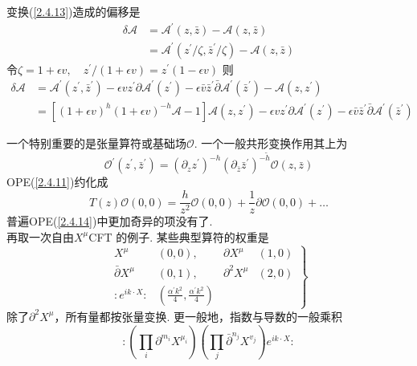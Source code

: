 \begin{remark}
变换(\ref{2.4.13})造成的偏移是
$$
\begin{aligned}
\delta \mathscr{A} &=\mathscr{A}^{\prime}(z, \bar{z})-\mathscr{A}(z, \bar{z}) \\
&=\mathscr{A}^{\prime}(z^{\prime} / \zeta, \bar{z}^{\prime} / \zeta)-\mathscr{A} ( z, \bar{z})
\end{aligned}
$$
令$\zeta=1+\epsilon v, \quad z^{\prime} / (1+\epsilon v)=z^{\prime}(1-\epsilon v)$
则
$$
\begin{aligned}
\delta \mathscr{A} &=\mathscr{A}^{\prime}(z^{\prime}, \bar{z}^{\prime})-\epsilon v z^{\prime} \partial \mathscr{A}^{\prime}\left(z^{\prime}\right)-\epsilon \bar{v}{\bar{z}^{\prime}} \bar{\partial} \mathscr{A}^{\prime}(\bar{z}^{\prime})-\mathscr{A}(z, z^{\prime}) \\
&=[(1+\epsilon v)^{h}(1+\epsilon v)^{-h} \mathscr{A}-1]   \mathscr{A}(z, z^{\prime}) 
-\epsilon v z^{\prime} \partial \mathscr{A}^{\prime}(z^{\prime})-\epsilon \bar{v} \bar{z}^{\prime} \bar{\partial} \mathscr{A}^{\prime}(\bar{z}^{\prime})
\end{aligned}
$$
\end{remark}
一个特别重要的是张量算符或基础场$\mathcal{O}$.  一个一般共形变换作用其上为
\begin{equation}
\mathcal{O}^{\prime}\left(z^{\prime}, \bar{z}^{\prime}\right)=\left(\partial_{z} z^{\prime}\right)^{-h}\left(\partial_{\bar{z}} \bar{z}^{\prime}\right)^{-\tilde{h}} \mathcal{O}(z, \bar{z})
\end{equation}
OPE(\ref{2.4.11})约化成
\begin{equation}\label{2.4.16}
T(z) \mathcal{O}(0,0)=\frac{h}{z^{2}} \mathcal{O}(0,0)+\frac{1}{z} \partial \mathcal{O}(0,0)+\ldots
\end{equation}
普遍OPE(\ref{2.4.14})中更加奇异的项没有了.\\
再取一次自由$X^\mu$CFT 的例子. 某些典型算符的权重是
\begin{equation}
\left.\begin{array}{llll}
X^{\mu} & (0,0), & \partial X^{\mu} & (1,0) \\
\bar{\partial} X^{\mu} & (0,1), & \partial^{2} X^{\mu} & (2,0) \\
: e^{i k \cdot X}: & \left(\frac{\alpha^{\prime} k^{2}}{4}, \frac{\alpha^{\prime} k^{2}}{4}\right) & &
\end{array}\right\}
\end{equation}
除了$\partial^{2} X^{\mu}$，所有量都按张量变换. 更一般地，指数与导数的一般乘积
\begin{equation}
:\left(\prod_{i} \partial^{m_{i}} X^{\mu_{i}}\right)\left(\prod_{j} \bar{\partial}^{n_{j}} X^{v_{j}}\right) e^{i k \cdot X}:
\end{equation}
